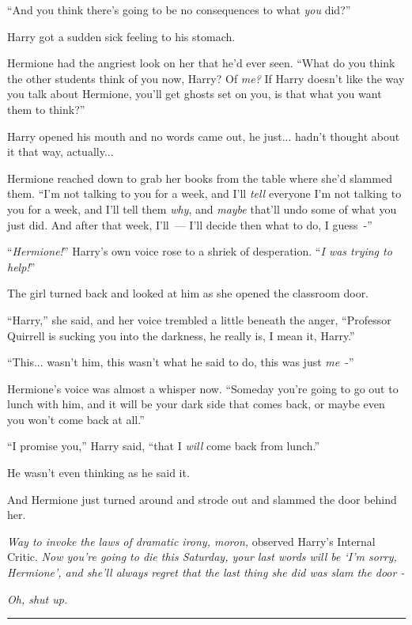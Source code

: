 ``And you think there's going to be no consequences to what \emph{you} did?''

Harry got a sudden sick feeling to his stomach.

Hermione had the angriest look on her that he'd ever seen. ``What do you think the other students think of you now, Harry? Of \emph{me?} If Harry doesn't like the way you talk about Hermione, you'll get ghosts set on you, is that what you want them to think?''

Harry opened his mouth and no words came out, he just... hadn't thought about it that way, actually...

Hermione reached down to grab her books from the table where she'd slammed them. ``I'm not talking to you for a week, and I'll \emph{tell} everyone I'm not talking to you for a week, and I'll tell them \emph{why}, and \emph{maybe} that'll undo some of what you just did. And after that week, I'll~--- I'll decide then what to do, I guess~-''

``\emph{Hermione!}'' Harry's own voice rose to a shriek of desperation. ``\emph{I was trying to help!}''

The girl turned back and looked at him as she opened the classroom door.

``Harry,'' she said, and her voice trembled a little beneath the anger, ``Professor Quirrell is sucking you into the darkness, he really is, I mean it, Harry.''

``This... wasn't him, this wasn't what he said to do, this was just \emph{me}~-''

Hermione's voice was almost a whisper now. ``Someday you're going to go out to lunch with him, and it will be your dark side that comes back, or maybe even you won't come back at all.''

``I promise you,'' Harry said, ``that I \emph{will} come back from lunch.''

He wasn't even thinking as he said it.

And Hermione just turned around and strode out and slammed the door behind her.

\emph{Way to invoke the laws of dramatic irony, moron,} observed Harry's Internal Critic. \emph{Now you're going to die this Saturday, your last words will be `I'm sorry, Hermione', and she'll always regret that the last thing she did was slam the door -}

\emph{Oh, shut up.}

\begin{center}\rule{3in}{0.4pt}\end{center}

